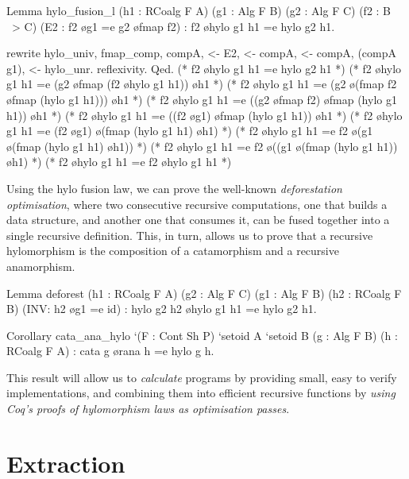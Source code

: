 \documentclass[anonymous, a4paper, UKenglish, cleveref, autoref, thm-restate]{lipics-v2021}
\begin{document}
\begin{coqcode}
Lemma hylo_fusion_l (h1 : RCoalg F A) (g1 : Alg F B) (g2 : Alg F C)
  (f2 : B ~> C) (E2 : f2 \o g1 =e g2 \o fmap f2) : f2 \o hylo g1 h1 =e hylo g2 h1.

  rewrite hylo_univ, fmap_comp, compA, <- E2,
          <- compA, <- compA, (compA g1), <- hylo_unr.  reflexivity.
Qed.
  (* f2 \o hylo g1 h1 =e hylo g2 h1 *)
  (* f2 \o hylo g1 h1 =e (g2 \o fmap (f2 \o hylo g1 h1)) \o h1 *)
  (* f2 \o hylo g1 h1 =e (g2 \o (fmap f2 \o fmap (hylo g1 h1))) \o h1 *)
  (* f2 \o hylo g1 h1 =e ((g2 \o fmap f2) \o fmap (hylo g1 h1)) \o h1 *)
  (* f2 \o hylo g1 h1 =e ((f2 \o g1) \o fmap (hylo g1 h1)) \o h1 *)
  (* f2 \o hylo g1 h1 =e (f2 \o g1) \o (fmap (hylo g1 h1) \o h1) *)
  (* f2 \o hylo g1 h1 =e f2 \o (g1 \o (fmap (hylo g1 h1) \o h1)) *)
  (* f2 \o hylo g1 h1 =e f2 \o ((g1 \o (fmap (hylo g1 h1)) \o h1) *)
  (* f2 \o hylo g1 h1 =e f2 \o hylo g1 h1 *)
\end{coqcode}
Using the hylo fusion law, we can prove the well-known \emph{deforestation
optimisation}, where two consecutive recursive computations, one that builds a
data structure, and another one that consumes it, can be fused together into a
single recursive definition. This, in turn, allows us to prove that a recursive
hylomorphism is the composition of a catamorphism and a recursive anamorphism.
\begin{coqcode}
Lemma deforest (h1 : RCoalg F A) (g2 : Alg F C)
  (g1 : Alg F B) (h2 : RCoalg F B) (INV: h2 \o g1 =e id)
  : hylo g2 h2 \o hylo g1 h1 =e hylo g2 h1.

Corollary cata_ana_hylo `(F : Cont Sh P) `{setoid A} `{setoid B}
  (g : Alg F B) (h : RCoalg F A)
: cata g \o rana h =e hylo g h.
\end{coqcode}
This result will allow us to \emph{calculate} programs by providing small, easy
to verify implementations, and combining them into efficient recursive
functions by \emph{using Coq's proofs of hylomorphism laws as optimisation
passes}.


\section{Extraction}
\end{document}
